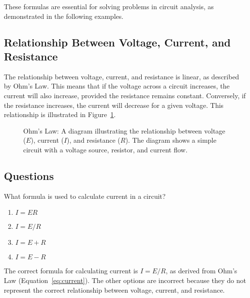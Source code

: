 These formulas are essential for solving problems in circuit analysis, as demonstrated in the following examples.

\subsection*{Relationship Between Voltage, Current, and Resistance}
The relationship between voltage, current, and resistance is linear, as described by Ohm's Law. This means that if the voltage across a circuit increases, the current will also increase, provided the resistance remains constant. Conversely, if the resistance increases, the current will decrease for a given voltage. This relationship is illustrated in Figure~\ref{fig:ohms_law}.

\begin{figure}[h]
    \centering
    \caption{Ohm's Law: A diagram illustrating the relationship between voltage (\(E\)), current (\(I\)), and resistance (\(R\)). The diagram shows a simple circuit with a voltage source, resistor, and current flow.}
    \label{fig:ohms_law}
\end{figure}

\subsection*{Questions}
\begin{tcolorbox}[colback=gray!10!white,colframe=black!75!black,title={T5D01}]
    What formula is used to calculate current in a circuit?
    \begin{enumerate}[label=\Alph*),noitemsep]
        \item \(I = E R\)
        \item \textbf{\(I = E / R\)}
        \item \(I = E + R\)
        \item \(I = E - R\)
    \end{enumerate}
\end{tcolorbox}
The correct formula for calculating current is \(I = E / R\), as derived from Ohm's Law (Equation~\ref{eq:current}). The other options are incorrect because they do not represent the correct relationship between voltage, current, and resistance.


